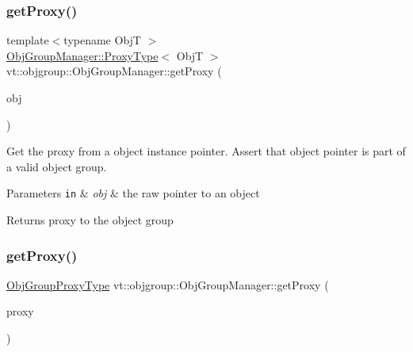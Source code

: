 \subsubsection{\texorpdfstring{get\+Proxy()}{getProxy()}\hspace{0.1cm}{\footnotesize\ttfamily [1/2]}}
{\footnotesize\ttfamily template$<$typename ObjT $>$ \\
\hyperlink{structvt_1_1objgroup_1_1_obj_group_manager_aea65eef52f240a52210132eef5ce591f}{Obj\+Group\+Manager\+::\+Proxy\+Type}$<$ ObjT $>$ vt\+::objgroup\+::\+Obj\+Group\+Manager\+::get\+Proxy (\begin{DoxyParamCaption}\item[{ObjT $\ast$}]{obj }\end{DoxyParamCaption})}



Get the proxy from a object instance pointer. Assert that object pointer is part of a valid object group. 


\begin{DoxyParams}[1]{Parameters}
\mbox{\tt in}  & {\em obj} & the raw pointer to an object\\
\hline
\end{DoxyParams}
\begin{DoxyReturn}{Returns}
proxy to the object group 
\end{DoxyReturn}
\mbox{\label{structvt_1_1objgroup_1_1_obj_group_manager_a9569c5ad1c032a90573bd987c64f560a}} 
\subsubsection{\texorpdfstring{get\+Proxy()}{getProxy()}\hspace{0.1cm}{\footnotesize\ttfamily [2/2]}}
{\footnotesize\ttfamily \hyperlink{namespacevt_ad7cae989df485fccca57f0792a880a8e}{Obj\+Group\+Proxy\+Type} vt\+::objgroup\+::\+Obj\+Group\+Manager\+::get\+Proxy (\begin{DoxyParamCaption}\item[{\hyperlink{namespacevt_ad7cae989df485fccca57f0792a880a8e}{Obj\+Group\+Proxy\+Type}}]{proxy }\end{DoxyParamCaption})}

\mbox{\label{structvt_1_1objgroup_1_1_obj_group_manager_a651c44a47c6bcdc9f1b6c9e857fa03f2}} 
